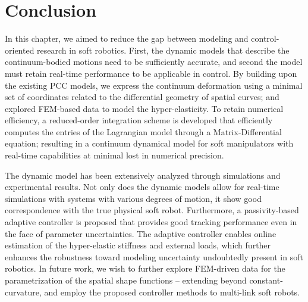 \section{Conclusion}
In this chapter, we aimed to reduce the gap between modeling and control-oriented research in soft robotics. First, the dynamic models that describe the continuum-bodied motions need to be sufficiently accurate, and second the model must retain real-time performance to be applicable in control. By building upon the existing PCC models, we express the continuum deformation using a minimal set of coordinates related to the differential geometry of spatial curves; and explored FEM-based data to model the hyper-elasticity. To retain numerical efficiency, a reduced-order integration scheme is developed that efficiently computes the entries of the Lagrangian model through a Matrix-Differential equation; resulting in a continuum dynamical model for soft manipulators with real-time capabilities at minimal lost in numerical precision. 

The dynamic model has been extensively analyzed through simulations and experimental results. Not only does the dynamic models allow for real-time simulations with systems with various degrees of motion, it show good correspondence with the true physical soft robot. Furthermore, a passivity-based adaptive controller is proposed that provides good tracking performance even in the face of parameter uncertainties. The adaptive controller enables online estimation of the hyper-elastic stiffness and external loads, which further enhances the robustness toward modeling uncertainty undoubtedly present in soft robotics. In future work, we wish to further explore FEM-driven data for the parametrization of the spatial shape functions -- extending beyond constant-curvature, and employ the proposed controller methods to multi-link soft robots.

\vfill